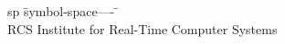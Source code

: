 \begin{listofsymbols}
\begin{tabbing}
sp	\= symbol-space---- \= \kill \+ \\

RCS	\> Institute for Real-Time Computer Systems \\

\end{tabbing}
\end{listofsymbols}